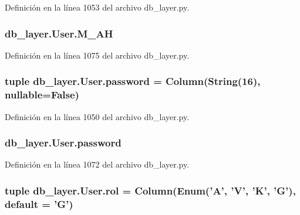Definición en la línea 1053 del archivo db\-\_\-layer.\-py.

\hypertarget{classdb__layer_1_1_user_a8bf13647d6c4516d117c8d2ee34c0eb1}{
\subsubsection[{M\-\_\-\-A\-H}]{\setlength{\rightskip}{0pt plus 5cm}db\-\_\-layer.\-User.\-M\-\_\-\-A\-H}}\label{classdb__layer_1_1_user_a8bf13647d6c4516d117c8d2ee34c0eb1}


Definición en la línea 1075 del archivo db\-\_\-layer.\-py.

\hypertarget{classdb__layer_1_1_user_ae6293d034b011b8ff8c7c0d77d914ab6}{
\subsubsection[{password}]{\setlength{\rightskip}{0pt plus 5cm}tuple db\-\_\-layer.\-User.\-password = Column(String(16), nullable=False)\hspace{0.3cm}{\ttfamily [static]}}}\label{classdb__layer_1_1_user_ae6293d034b011b8ff8c7c0d77d914ab6}


Definición en la línea 1050 del archivo db\-\_\-layer.\-py.

\hypertarget{classdb__layer_1_1_user_a0789b78aa38f55339c6d584363207566}{
\subsubsection[{password}]{\setlength{\rightskip}{0pt plus 5cm}db\-\_\-layer.\-User.\-password}}\label{classdb__layer_1_1_user_a0789b78aa38f55339c6d584363207566}


Definición en la línea 1072 del archivo db\-\_\-layer.\-py.

\hypertarget{classdb__layer_1_1_user_ae4e4cc108d1b9fcb54c93f28d8c04cce}{
\subsubsection[{rol}]{\setlength{\rightskip}{0pt plus 5cm}tuple db\-\_\-layer.\-User.\-rol = Column(Enum('A', 'V', 'K', 'G'), default = 'G')\hspace{0.3cm}{\ttfamily [static]}}}\label{classdb__layer_1_1_user_ae4e4cc108d1b9fcb54c93f28d8c04cce}


